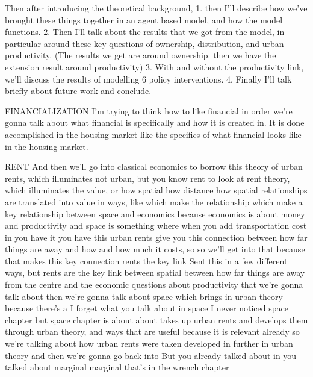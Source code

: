 Then  after introducing the theoretical background, 
1. then I'll describe how we've brought these things together in an agent based model, and how the model functions. 
2. Then I'll talk about the results that we got from the model, in particular around these key questions of ownership, distribution, and urban productivity.  (The results we get  are around ownership. then we have the extension result around productivity) 
3. With and without the productivity link, we'll discuss the results of modelling 6 policy interventions. 
4. Finally I'll talk briefly about future work and conclude. 





FINANCIALIZATION
I’m trying to think how to like financial in order we’re gonna talk about what financial is specifically and how it is created in. It is done accomplished in the housing market like the specifics of what financial looks like in the housing market.

RENT
And then we’ll go into classical economics to borrow this theory of urban rents, which illuminates not urban, but you know rent to look at rent theory, which illuminates the value, or how spatial how distance how spatial relationships are translated into value in ways, like which make the relationship which make a key relationship between space and economics because economics is about money and productivity and space is something where when you add transportation cost in you have it you have this urban rents give you this connection between how far things are away and how and how much it costs, so so we’ll get into that because that makes this key connection rents the key link Sent this in a few different ways, but rents are the key link between spatial between how far things are away from the centre and the economic questions about productivity that we’re gonna talk about then we’re gonna talk about space which brings in urban theory because there’s a I forget what you talk about in space I never noticed space chapter but space chapter is about about takes up urban rents and develops them through urban theory, and ways that are useful because it is relevant already so we’re talking about how urban rents were taken developed in further in urban theory and then we’re gonna go back into But you already talked about in you talked about marginal marginal that’s in the wrench chapter

